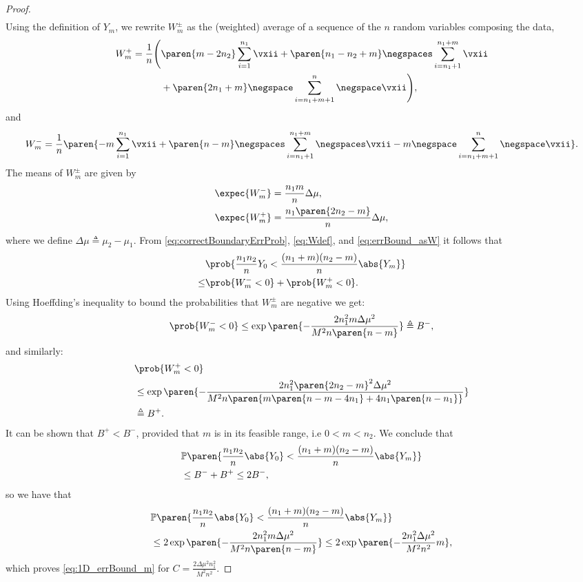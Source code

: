 \begin{proof}
\begin{align*}
\end{align*}
Using the definition of $Y_m$, we rewrite $W_m^{\pm}$
as the (weighted) average of a sequence of the $n$ random variables composing the data,
\begin{align}
    W_m^+=\frac{1}{n}\Bigg(&\paren{m-2n_2}\sum_{i=1}^{n_1}\vxii+\paren{n_1-n_2+m}\negspaces\sum_{i=n_1+1}^{n_1+m}\vxii\nonumber\\
    &+\paren{2n_1+m}\negspace\sum_{i=n_1+m+1}^{n}\negspace\vxii\Bigg),\nonumber
\end{align}
and
\[
    W_m^-=\frac{1}{n}\paren{-m\sum_{i=1}^{n_1}\vxii+\paren{n-m}\negspaces\sum_{i=n_1+1}^{n_1+m}\negspaces\vxii-m\negspace
    \sum_{i=n_1+m+1}^{n}\negspace\vxii}.
\]
The means of $W_m^{\pm}$ are given by
\begin{align*}
    \expec{W_m^-} &= \frac{n_1m}{n}\Delta\mu,\\
    \expec{W_m^+} &= \frac{n_1\paren{2n_2-m}}{n}\Delta\mu,
\end{align*}
where we define $\Delta\mu\triangleq\mu_2-\mu_1$. From \eqref{eq:correctBoundaryErrProb}, \eqref{eq:Wdef}, and \eqref{eq:errBound_asW} it follows that
\begin{align*}
    &\prob{\frac{n_1n_2}{n}Y_0<\frac{(n_1+m)(n_2-m)}{n}\abs{Y_m}}\\
    \leq&\prob{W_m^-<0}+\prob{W_m^+<0}.\nonumber
\end{align*}
Using Hoeffding's inequality to bound the probabilities that $W_m^{\pm}$ are negative we get:
\begin{align*}%
    \prob{W_m^-<0}\leq\exp\paren{-\frac{2n_1^2m\Delta\mu^2}{M^2n\paren{n-m}}}\triangleq B^-,
\end{align*}
and similarly:
\begin{align*}%
    &\prob{W_m^+<0}\\
    &\leq\exp\paren{-\frac{2n_1^2\paren{2n_2-m}^2\Delta\mu^2}{M^2n\paren{m\paren{n-m-4n_1}+4n_1\paren{n-n_1}}}}\\
    &\triangleq B^+.
\end{align*}
It can be shown that $B^+<B^-$, provided that $m$ is in its feasible range, i.e $0<m<n_2$. We conclude that
\begin{align*}
    &\mathbb{P}\paren{\frac{n_1n_2}{n}\abs{Y_0}<\frac{(n_1+m)(n_2-m)}{n}\abs{Y_m}}\\
    &\leq B^-+B^+\leq 2B^-,
\end{align*}
so we have that
\begin{align*}
    &\mathbb{P}\paren{\frac{n_1n_2}{n}\abs{Y_0}<\frac{(n_1+m)(n_2-m)}{n}\abs{Y_m}}\\
    &\leq2\exp\paren{-\frac{2n_1^2m\Delta\mu^2}{M^2n\paren{n-m}}}\leq2\exp\paren{-\frac{2n_1^2\Delta\mu^2}{M^2n^2}m},
\end{align*}
which proves \eqref{eq:1D_errBound_m} for
$C=\frac{2\Delta\mu^2n_1^2}{M^2n^2}$.
\end{proof} \QED
\newpage
